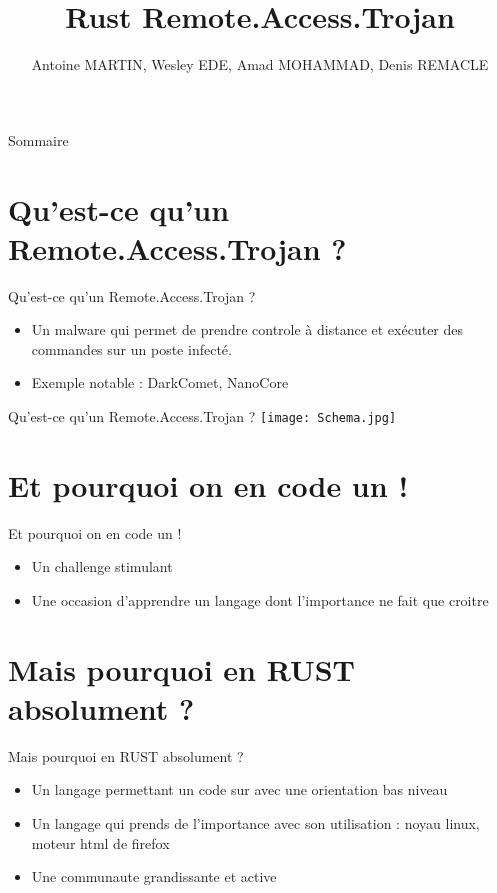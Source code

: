 \documentclass{beamer}
\title{Rust Remote.Access.Trojan}
\author{Antoine MARTIN, Wesley EDE, Amad MOHAMMAD, Denis REMACLE}
\begin{document}
  \begin{frame}
 \maketitle
  \end{frame}

\begin{frame}{Sommaire}
    \tableofcontents
\end{frame}

\section{Qu'est-ce qu'un Remote.Access.Trojan ?}
  \begin{frame}{Qu'est-ce qu'un Remote.Access.Trojan ?}
  \begin{itemize}
	\item Un malware qui permet de prendre controle à distance et exécuter des commandes sur un poste infecté.
	\item Exemple notable : DarkComet, NanoCore
  \end{itemize}
  \end{frame}

  \begin{frame}{Qu'est-ce qu'un Remote.Access.Trojan ?}
\texttt{[image: Schema.jpg]}
  \end{frame}

\section{Et pourquoi on en code un !}
  \begin{frame}{Et pourquoi on en code un !}
  \begin{itemize}
	\item Un challenge stimulant
	\item Une occasion d'apprendre un langage dont l'importance ne fait que croitre
  \end{itemize}
  \end{frame}

\section{Mais pourquoi en RUST absolument ?}
  \begin{frame}{Mais pourquoi en RUST absolument ?}
  \begin{itemize}
	\item Un langage permettant un code sur avec une orientation bas niveau
	\item Un langage qui prends de l'importance avec son utilisation : noyau linux, moteur html de firefox
	\item Une communaute grandissante et active
  \end{itemize}
  \end{frame}
\end{document}
